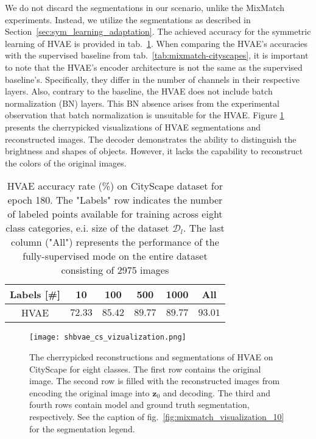 We do not discard the segmentations in our scenario, unlike the MixMatch experiments. Instead, we utilize the segmentations
as described in Section~\ref{sec:sym_learning_adaptation}. The achieved accuracy for the symmetric learning of HVAE is provided 
in tab.~\ref{tab:hvae-cityscapes-acc}. When comparing the HVAE's accuracies with the supervised baseline from 
tab.~\ref{tab:mixmatch-cityscapes}, it is important to note that the HVAE's encoder architecture is not the same 
as the supervised baseline's. Specifically, they differ in the number of channels in their respective layers. 
Also, contrary to the baseline, the HVAE does not include batch normalization (BN) layers. This BN absence arises from the experimental observation
that batch normalization is unsuitable for the HVAE. Figure \ref{fig:hvae-cs} presents the cherrypicked visualizations of HVAE segmentations and reconstructed 
images. The decoder demonstrates the ability to distinguish the brightness and shapes of objects. However, it lacks the capability to reconstruct the 
colors of the original images.
\begin{table}[tbh]
    \begin{tabular}{|c|c|c|c|c|c|}
    \hline
    Labels [\#]  & 10 & 100 & 500 & 1000 & All \\
    \hline
    HVAE & $72.33$ & $85.42$ & $89.77$ & $89.77$ & $93.01$ \\
    \hline
    \end{tabular}
    \caption[HVAE plain accuracy on CityScape]{HVAE accuracy rate (\%) on CityScape dataset for epoch 180. The 
    "Labels" row indicates the number of labeled points available for training across eight class categories, e.i. size of the dataset $\mathcal{D}_l$. The last 
    column ("All") represents the performance of the fully-supervised mode on the entire dataset consisting of 2975 images}
    \label{tab:hvae-cityscapes-acc}
\end{table}

\begin{figure}[t]
    \centering
    \texttt{[image: shbvae\_cs\_vizualization.png]}
    \caption[Symmetric learning HVAE CityScape results]{The cherrypicked reconstructions and segmentations of HVAE on CityScape for eight classes. The first row contains the original image. The second row is filled with the reconstructed
    images from encoding the original image into $\mathbf{z}_0$ and decoding. The third and fourth rows contain model and ground truth segmentation, respectively.
    See the caption of fig.~\ref{fig:mixmatch_visualization_10} for the segmentation legend.}
    \label{fig:hvae-cs}
\end{figure}


